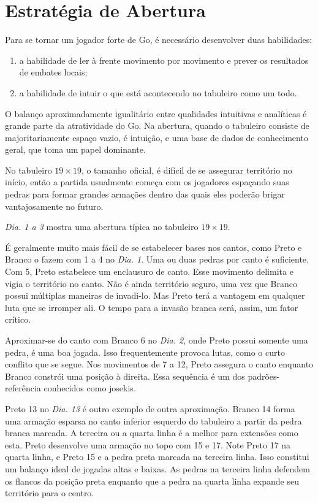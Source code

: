 \chapter{Estratégia de Abertura}

Para se tornar um jogador forte de Go, é necessário desenvolver duas habilidades:

\begin{enumerate}
    \item a habilidade de ler à frente movimento por movimento e prever os resultados de embates locais;
    \item a habilidade de intuir o que está acontecendo no tabuleiro como um todo.
\end{enumerate}

O balanço aproximadamente igualitário entre qualidades intuitivas e analíticas é grande parte da atratividade do Go. Na abertura, quando o tabuleiro consiste de majoritariamente espaço vazio, é intuição, e uma base de dados de conhecimento geral, que toma um papel dominante.

No tabuleiro $19\times19$, o tamanho oficial, é difícil de se assegurar território no início, então a partida usualmente começa com os jogadores espaçando suas pedras para formar grandes armações dentro das quais eles poderão brigar vantajosamente no futuro.

\emph{Dia. 1 a 3} mostra uma abertura típica no tabuleiro $19\times19$.

É geralmente muito mais fácil de se estabelecer bases nos cantos, como Preto e Branco o fazem com 1 a 4 no \emph{Dia. 1}. Uma ou duas pedras por canto é suficiente. Com 5, Preto estabelece um enclausuro de canto. Esse movimento delimita e vigia o território no canto. Não é ainda território seguro, uma vez que Branco possui múltiplas maneiras de invadi-lo. Mas Preto terá a vantagem em qualquer luta que se irromper ali. O tempo para a invasão branca será, assim, um fator crítico.

Aproximar-se do canto com Branco 6 no \emph{Dia. 2}, onde Preto possui somente uma pedra, é uma boa jogada. Isso frequentemente provoca lutas, como o curto conflito que se segue. Nos movimentos de 7 a 12, Preto assegura  o canto enquanto Branco constrói uma posição à direita. Essa sequência é um dos padrões-referência conhecidos como josekis.

Preto 13 no \emph{Dia. 13} é outro exemplo de outra aproximação. Branco 14 forma uma armação esparsa no canto inferior esquerdo do tabuleiro a partir da pedra branca marcada. A terceira ou a quarta linha é a melhor para extensões como esta. Preto desenvolve uma armação no topo com 15 e 17. Note Preto 17 na quarta linha, e Preto 15 e a pedra preta marcada na terceira linha. Isso constitui um balanço ideal de jogadas altas e baixas. As pedras na terceira linha defendem os flancos da posição preta enquanto que a pedra na quarta linha expande seu território para o centro.

